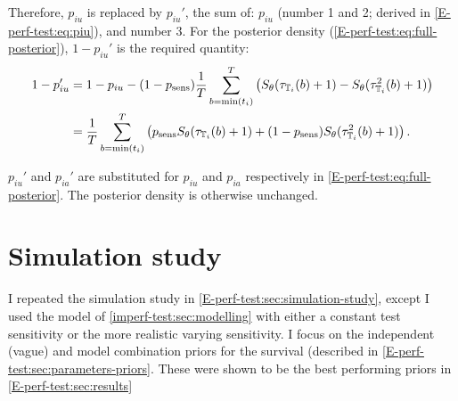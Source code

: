 \documentclass[thesis.tex]{subfiles}
\begin{document}
Therefore, $p_{iu}$ is replaced by $p_{iu}'$, the sum of: $p_{iu}$ (number 1 and 2; derived in \cref{E-perf-test:eq:piu}), and number 3.
For the posterior density (\cref{E-perf-test:eq:full-posterior}), $1 - p_{iu}'$ is the required quantity:
\begin{align}
1 - p_{iu}'
&= 1 - p_{iu} - (1 - p_\text{sens})\frac{1}{T} \sum_{b=\min(t_i)}^T \left( S_\theta(\tau_{\mathbb{T}_i}(b) + 1) - S_\theta(\tau^2_{\mathbb{T}_i}(b) + 1) \right) \\
&= \frac{1}{T} \sum_{b=\min(t_i)}^T \left( p_\text{sens} S_\theta(\tau_{\mathbb{T}_i}(b) + 1) + (1 - p_\text{sens}) S_\theta(\tau^2_{\mathbb{T}_i}(b) + 1)\right).
\label{imperf-test:eq:pit-prime}
\end{align}

$p_{iu}'$ and $p_{ia}'$ are substituted for $p_{iu}$ and $p_{ia}$ respectively in \cref{E-perf-test:eq:full-posterior}.
The posterior density is otherwise unchanged.

\section{Simulation study} \label{imperf-test:sec:sim-study-results}

I repeated the simulation study in \cref{E-perf-test:sec:simulation-study}, except I used the model of \cref{imperf-test:sec:modelling} with either a constant test sensitivity or the more realistic varying sensitivity.
I focus on the independent (vague) and model combination priors for the survival (described in \cref{E-perf-test:sec:parameters-priors}.
These were shown to be the best performing priors in \cref{E-perf-test:sec:results}
\end{document}
